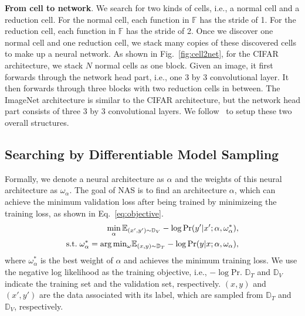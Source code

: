 \documentclass[10pt,twocolumn,letterpaper]{article}
\def\Figref#1{Fig.~\ref{#1}}
\def\Eqref#1{Eq.~\eqref{#1}}
\def\sD{{\mathbb{D}}}
\def\sE{{\mathbb{E}}}
\def\sF{{\mathbb{F}}}
\begin{document}
\textbf{From cell to network}.
We search for two kinds of cells, i.e., a normal cell and a reduction cell.
For the normal cell, each function in $\sF$ has the stride of 1.
For the reduction cell, each function in $\sF$ has the stride of 2.
Once we discover one normal cell and one reduction cell, we stack many copies of these discovered cells to make up a neural network.
As shown in \Figref{fig:cell2net}, for the CIFAR architecture, we stack $N$ normal cells as one block.
Given an image, it first forwards through the network head part, i.e., one 3 by 3 convolutional layer.
It then forwards through three blocks with two reduction cells in between. The ImageNet architecture is similar to the CIFAR architecture, but the network head part consists of three 3 by 3 convolutional layers.
We follow~\cite{liu2019darts} to setup these two overall structures.






\subsection{Searching by Differentiable Model Sampling}\label{sec:method-sample}

Formally, we denote a neural architecture as $\alpha$ and the weights of this neural architecture as $\omega_{\alpha}$.
The goal of NAS is to find an architecture $\alpha$, which can achieve the minimum validation loss after being trained by minimizeing the training loss, as shown in \Eqref{eq:objective}.
\begin{align}\label{eq:objective}
\min_{\alpha} \sE_{(x',y')\sim{\sD}_{V}} -\log\mathrm{Pr}(y'|x'; \alpha, \omega_{\alpha}^{*}) ,  \nonumber\\
    \mathrm{s.t.}\hspace{1mm}\omega_{\alpha}^{*} = \arg{\min}_{\omega} \sE_{(x,y)\sim{\sD}_{T}} -\log\mathrm{Pr}(y|x; \alpha, \omega_{\alpha}) ,
\end{align}
\noindent where $\omega_{\alpha}^{*}$ is the best weight of $\alpha$ and achieves the minimum training loss.
We use the negative log likelihood as the training objective, i.e., $-\log\mathrm{Pr}$.
${\sD}_{T}$ and ${\sD}_{V}$ indicate the training set and the validation set, respectively.
$(x,y)$ and $(x',y')$ are the data associated with its label, which are sampled from ${\sD}_{T}$ and ${\sD}_{V}$, respectively.
\end{document}
